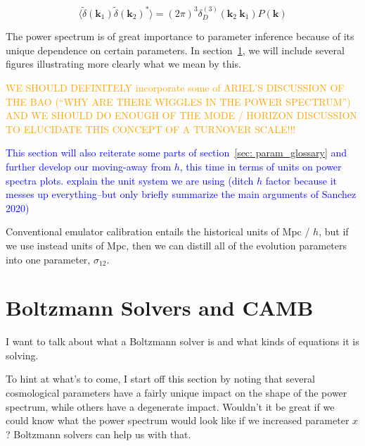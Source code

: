 \begin{equation}
\langle \tilde{\delta} (\bm{k}_1) \tilde{\delta} (\bm{k}_2)^* \rangle
=
(2 \pi)^3 \delta_D^{(3)} (\bm{k}_2 \ \bm{k}_1) P(\bm{k})
\end{equation}


The power spectrum is of great importance to parameter inference because of
its unique dependence on certain parameters.
In section~\ref{sec: boltzmann_intro}, we will include several figures 
illustrating more clearly what we mean by this.


\textcolor{orange}{WE SHOULD DEFINITELY incorporate some of ARIEL'S DISCUSSION 
OF THE BAO 
(``WHY ARE THERE
WIGGLES IN THE POWER SPECTRUM'') AND WE SHOULD DO ENOUGH OF THE MODE / HORIZON
DISCUSSION TO ELUCIDATE THIS CONCEPT OF A TURNOVER SCALE!!!}


\textcolor{blue}{This section will also reiterate some parts of 
section~\ref{sec: param_glossary} and further develop our moving-away from 
$h$, this time in terms of units on power spectra plots. explain the unit system
    we are using (ditch $h$ factor because it messes up everything--but
    only briefly summarize the main arguments of Sanchez 2020)}


Conventional emulator calibration entails the historical units of Mpc / $h$,
but if we use instead units of Mpc, then we can distill all of the evolution
parameters into one parameter, $\sigma_{12}$. 


\section{Boltzmann Solvers and CAMB}
\label{sec: boltzmann_intro}

I want to talk about what a Boltzmann solver is and what kinds of equations it is solving.

To hint at what's to come, I start off this section by noting that several cosmological parameters have a fairly unique impact on the shape of the power spectrum, while others have a degenerate impact. Wouldn't it be great if we could know what the power spectrum would look like if we increased parameter $x$? Boltzmann solvers can help us with that.

